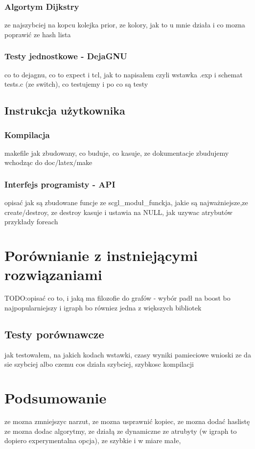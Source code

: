 \documentclass[a4paper,12pt]{thesis}
\begin{document}
\subsection{Algortym Dijkstry}
ze najszybciej na kopcu kolejka prior, ze kolory, jak to u mnie działa i co mozna poprawić ze hash lista
\subsection{Testy jednostkowe - DejaGNU}
co to dejagnu, co to expect i tcl, jak to napisałem czyli wstawka .exp i schemat tests.c (ze switch), co testujemy i po co są testy
\section{Instrukcja użytkownika}
\subsection{Kompilacja}
makefile jak zbudowany, co buduje, co kasuje, ze dokumentacje zbudujemy wchodząc do doc/latex/make 
\subsection{Interfejs programisty - API}
opisać jak są zbudowane funcje ze scgl\_moduł\_funckja, jakie są najważniejsze,ze create/destroy, ze destroy kasuje i ustawia na NULL, jak uzywac atrybutów przykłady foreach 
\chapter{Porównianie z instniejącymi rozwiązaniami}
TODO:opisać co to, i jaką ma filozofie do grafów - wybór padł na boost bo najpopularniejszy i igraph bo równiez jedna z większych bibliotek
\section{Testy porównawcze}
jak testowałem, na jakich kodach wstawki, czasy wyniki pamieciowe wnioski ze da sie szybciej albo czemu cos działa szybciej, szybkosc kompilacji
\chapter*{Podsumowanie}
ze mozna zmniejszyc narzut, ze mozna usprawnić kopiec, ze mozna dodać haslistę  ze mozna dodac algorytmy, 
   ze działą ze dynamiczne ze atrubyty (w igraph to dopiero experymentalna opcja), ze szybkie i w miare małe, 
\end{document}
